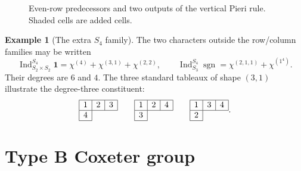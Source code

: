 \documentclass[11pt]{article}
\numberwithin{equation}{section}
\theoremstyle{definition}
\newtheorem{example}[theorem]{Example}
\DeclareMathOperator{\Ind}{Ind}
\DeclareMathOperator{\sgn}{sgn}
\newcommand{\one}{\mathbf 1}
\begin{document}
\begin{figure}[htbp]
\centering
{}
\caption{Even-row predecessors and two outputs of the vertical Pieri rule. Shaded cells are added cells.}
\label{fig:pieri}
\end{figure}

\begin{example}[The extra \(S_4\) family]
The two characters outside the row/column families may be written
\[
 \Ind_{S_2\times S_2}^{S_4}\one
   =\chi^{(4)}+\chi^{(3,1)}+\chi^{(2,2)},\qquad
 \Ind_{S_3}^{S_4}\sgn
   =\chi^{(2,1,1)}+\chi^{(1^4)}.
\]
Their degrees are \(6\) and \(4\).
The three standard tableaux of shape \((3,1)\) illustrate the degree-three constituent:
\[
 \begin{array}{|c|c|c|}\hline1&2&3\\\hline4\\\cline{1-1}\end{array}
 \qquad
 \begin{array}{|c|c|c|}\hline1&2&4\\\hline3\\\cline{1-1}\end{array}
 \qquad
 \begin{array}{|c|c|c|}\hline1&3&4\\\hline2\\\cline{1-1}\end{array}.
\]
\end{example}
\section{Type B Coxeter group}
\label{sec:B}
\end{document}
